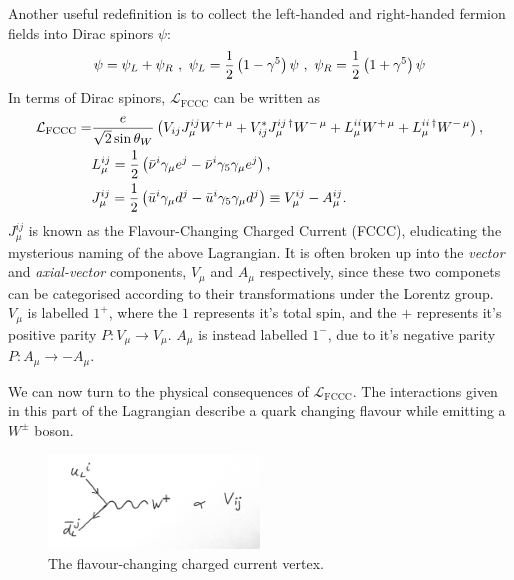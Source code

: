 Another useful redefinition is to collect the left-handed and right-handed fermion fields into Dirac spinors $\psi$:
\begin{align}
  \psi = \psi_L + \psi_R \,\,,\,\, \psi_L = {1\over 2}\left(1-\gamma^5 \right) \psi \,\,,\,\, \psi_R = {1\over 2}\left(1+\gamma^5\right) \psi
\end{align}
In terms of Dirac spinors, $\mathcal{L}_{\text{FCCC}}$ can be written as
\begin{align}
  \mathcal{L}_{\text{FCCC}} =& {e \over \sqrt{2} \sin \theta_W} \left( V_{ij} J^{ij}_{\mu} W^{+\,\mu} + V^*_{ij} J^{ij\,\dagger}_{\mu} W^{-\,\mu} +
L^{ii}_{\mu} W^{+\,\mu} + L^{ii\,\dagger}_{\mu} W^{-\,\mu}
\right), \\
  &L^{ij}_{\mu} = {1\over2}\left(\bar{\nu}^i \gamma_{\mu} e^j - \bar{\nu}^i \gamma_5 \gamma_{\mu} e^j\right), \\
  &J^{ij}_{\mu} = {1\over2}\left(\bar{u}^i \gamma_{\mu} d^j - \bar{u}^i \gamma_5 \gamma_{\mu} d^j\right) \equiv V^{ij}_{\mu} - A^{ij}_{\mu}.
\end{align}
$J^{ij}_{\mu}$ is known as the Flavour-Changing Charged Current (FCCC), eludicating the mysterious naming of the above Lagrangian. It is often broken up into the {\it{vector}} and {\it{axial-vector}} components, $V_{\mu}$ and $A_{\mu}$ respectively, since these two componets can be categorised according to their transformations under the Lorentz group. $V_{\mu}$ is labelled $1^+$, where the $1$ represents it's total spin, and the $+$ represents it's positive parity $P: V_{\mu} \to V_{\mu}$. $A_{\mu}$ is instead labelled $1^-$, due to it's negative parity $P: A_{\mu} \to - A_{\mu}$.

We can now turn to the physical consequences of $\mathcal{L}_{\text{FCCC}}$. The interactions given in this part of the Lagrangian describe a quark changing flavour while emitting a $W^{\pm}$ boson.

\begin{figure}
  \begin{center}
    \vspace{-10pt}
    \includegraphics[width=0.5\textwidth]{images/fccc.jpg}
    \vspace{-10pt}
  \end{center}
  \caption{The flavour-changing charged current vertex.}
  \label{fig:fccc}
\end{figure}

